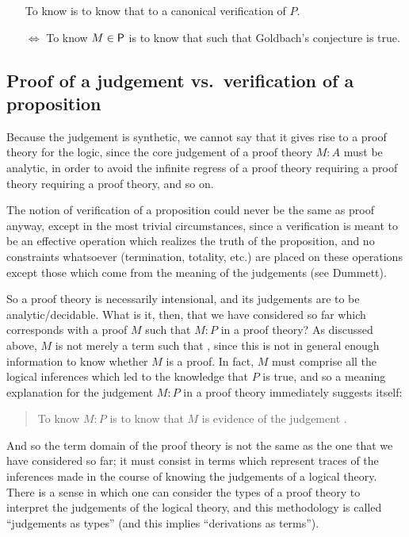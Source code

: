 \documentclass[main.tex]{subfiles}
\begin{document}
\begin{itemize}
  \item[] To know  is to know that  to a
    canonical verification of $P$.
  \item[$\Leftrightarrow$] To know $M\in\mathsf{P}$ is to know that
     such that Goldbach's conjecture is true.
\end{itemize}

\subsection{Proof of a judgement vs.\ verification of a proposition}

Because the judgement  is synthetic, we cannot say that it gives rise
to a proof theory for the logic, since the core judgement of a proof theory
$M:A$ must be analytic, in order to avoid the infinite regress of a proof
theory requiring a proof theory requiring a proof theory, and so on.

The notion of verification of a proposition could never be the same as proof
anyway, except in the most trivial circumstances, since a verification is meant
to be an effective operation which realizes the truth of the proposition, and
no constraints whatsoever (termination, totality, etc.) are placed on these
operations except those which come from the meaning of the judgements (see
Dummett).

So a proof theory is necessarily intensional, and its judgements are to be
analytic/decidable. What is it, then, that we have considered so far which
corresponds with a proof $M$ such that $M:P$ in a proof theory? As discussed
above, $M$ is not merely a term such that , since this is not in
general enough information to know whether $M$ is a proof. In fact, $M$ must
comprise all the logical inferences which led to the knowledge that $P$ is
true, and so a meaning explanation for the judgement $M:P$ in a proof theory
immediately suggests itself:
\begin{quote}
  To know $M:P$ is to know that $M$ is evidence of the judgement .
\end{quote}

And so the term domain of the proof theory is not the same as the one that we
have considered so far; it must consist in terms which represent traces of the
inferences made in the course of knowing the judgements of a logical theory.
There is a sense in which one can consider the types of a proof theory to
interpret the judgements of the logical theory, and this methodology is called
``judgements as types'' (and this implies ``derivations as terms'').
\end{document}
